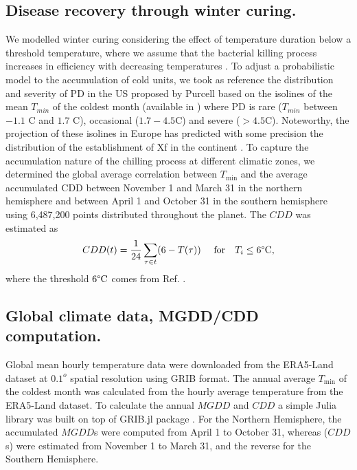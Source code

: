     \subsection{Disease recovery through winter curing.}  We modelled winter
    curing
    considering the effect of temperature duration below a threshold
    temperature,
    where we assume that the bacterial killing process increases in efficiency
    with
    decreasing temperatures \cite{Lieth2011}. To adjust a probabilistic model
    to
    the accumulation of cold units, we took as reference the distribution and
    severity of PD in the US proposed by Purcell based on the isolines of the
    mean
$T_{ min}$ of the coldest month (available in \cite{Anas2008}) where PD is rare
    ($T_{ min}$ between $-1.1$ \textdegree C and $1.7$ \textdegree C),
    occasional
    ($1.7-4.5$\textdegree C) and severe ($> 4.5$\textdegree C). Noteworthy, the
    projection of these isolines in Europe has predicted with some precision
    the
    distribution of the establishment of Xf in the continent
    \cite{Bragard2019}. To
    capture the accumulation nature of the chilling process at different
    climatic
    zones, we determined the global average correlation between
$T_{\textrm{min}}$
    and the average accumulated CDD between November 1 and March 31 in the
    northern
    hemisphere and between April 1 and October 31 in the southern hemisphere
    using
    6,487,200 points distributed throughout the planet. The $CDD$ was estimated
    as
    \begin{equation}
        CDD(t)= \frac{1}{24}\sum_{\tau \in t} (6-T(\tau)) \ \quad \textrm{for}
        \quad T_i\le 6\textrm{\textdegree C} ,
    \end{equation}
    where the threshold $6 \textrm{\textdegree C}$ comes from Ref.
    \cite{Lieth2011}.

    \subsection{Global climate data, MGDD/CDD computation.}
    Global mean hourly temperature data were downloaded from the ERA5-Land
    dataset
    \cite{ERA5_dataset} at $0.1^o$ spatial resolution using GRIB format. The
    annual
    average $T_{\textrm{min}}$ of the coldest month was calculated from the
    hourly
    average temperature from the ERA5-Land dataset. To calculate the annual
$MGDD$
    and $CDD$ a simple Julia \cite{julia} library was built on top of GRIB.jl
    package \cite{GRIB}. For the Northern Hemisphere, the accumulated $MGDD$s
    were
    computed from April 1 to October 31, whereas ($CDD$s) were estimated from
    November 1 to March 31, and the reverse for the Southern Hemisphere.


